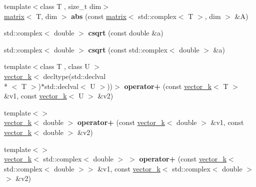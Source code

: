 \begin{DoxyCompactItemize}
\item 
\hypertarget{namespacekeycpp_a6f7d77410749bcf5a36793e3754e357b}{{\footnotesize template$<$class T , size\-\_\-t dim$>$ }\\\hyperlink{classkeycpp_1_1matrix}{matrix}$<$ T, dim $>$ {\bfseries abs} (const \hyperlink{classkeycpp_1_1matrix}{matrix}$<$ std\-::complex$<$ T $>$, dim $>$ \&A)}\label{namespacekeycpp_a6f7d77410749bcf5a36793e3754e357b}

\item 
\hypertarget{namespacekeycpp_a952e5296774667c3be4e792b5cd980da}{std\-::complex$<$ double $>$ {\bfseries csqrt} (const double \&a)}\label{namespacekeycpp_a952e5296774667c3be4e792b5cd980da}

\item 
\hypertarget{namespacekeycpp_a8faa7912f1f198c5185cb6a36cfd2fb2}{std\-::complex$<$ double $>$ {\bfseries csqrt} (const std\-::complex$<$ double $>$ \&a)}\label{namespacekeycpp_a8faa7912f1f198c5185cb6a36cfd2fb2}

\item 
\hypertarget{namespacekeycpp_aa865f0bd18bdefcf413b1c3dd286b998}{{\footnotesize template$<$class T , class U $>$ }\\\hyperlink{classkeycpp_1_1vector__k}{vector\-\_\-k}$<$ decltype(std\-::declval\\*
$<$ T $>$)$\ast$std\-::declval$<$ U $>$))$>$ {\bfseries operator+} (const \hyperlink{classkeycpp_1_1vector__k}{vector\-\_\-k}$<$ T $>$ \&v1, const \hyperlink{classkeycpp_1_1vector__k}{vector\-\_\-k}$<$ U $>$ \&v2)}\label{namespacekeycpp_aa865f0bd18bdefcf413b1c3dd286b998}

\item 
\hypertarget{namespacekeycpp_ae416b3cc307c30afdb62f0ed37b70e05}{{\footnotesize template$<$$>$ }\\\hyperlink{classkeycpp_1_1vector__k}{vector\-\_\-k}$<$ double $>$ {\bfseries operator+} (const \hyperlink{classkeycpp_1_1vector__k}{vector\-\_\-k}$<$ double $>$ \&v1, const \hyperlink{classkeycpp_1_1vector__k}{vector\-\_\-k}$<$ double $>$ \&v2)}\label{namespacekeycpp_ae416b3cc307c30afdb62f0ed37b70e05}

\item 
\hypertarget{namespacekeycpp_ade9508aa24d2496bd63dcdb72229c8b0}{{\footnotesize template$<$$>$ }\\\hyperlink{classkeycpp_1_1vector__k}{vector\-\_\-k}$<$ std\-::complex$<$ double $>$ $>$ {\bfseries operator+} (const \hyperlink{classkeycpp_1_1vector__k}{vector\-\_\-k}$<$ std\-::complex$<$ double $>$$>$ \&v1, const \hyperlink{classkeycpp_1_1vector__k}{vector\-\_\-k}$<$ std\-::complex$<$ double $>$$>$ \&v2)}\label{namespacekeycpp_ade9508aa24d2496bd63dcdb72229c8b0}


\end{DoxyCompactItemize}
